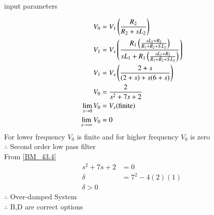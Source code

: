 \documentclass[journal,12pt,onecolumn]{IEEEtran}
\theoremstyle{remark}
\begin{document}
 \begin{table}[!ht]
    \centering
        
    \caption{input parameters}
\end{table}
\begin{align}
    V_0&=V_1\left(\frac{R_2}{R_2+sL_2}\right)\\
   V_1&=V_s\left(\frac{R_1\left(\frac{sL_2+R_2}{R_1+R_2+SL_2}\right)}{sL_1+R_1\left(\frac{sL_2+R_2}{R_1+R_2+SL_2}\right)}\right)\\
   V_1&=V_s\left(\frac{2+s}{(2+s)+s(6+s)}\right)\\
   V_0&=\frac{2}{s^2+7s+2}\\ \label{BM_43.4}
    \lim _{s\rightarrow 0} V_0 &= V_s \text{(finite)}\\
    \lim _{s\rightarrow \infty} V_0 &= 0
\end{align}
For lower frequency $V_0$ is finite and for higher frequency $V_0$ is zero\\
 $\therefore $  Second order low pass filter\\
 From \ref{BM_43.4}
\begin{align}
    s^2+7s+2&=0\\
   \delta&= 7^2-4(2)(1)\\
   \delta>0
\end{align}
$\therefore $  Over-damped System\\
$\therefore$ B,D are correct options
\end{document}
